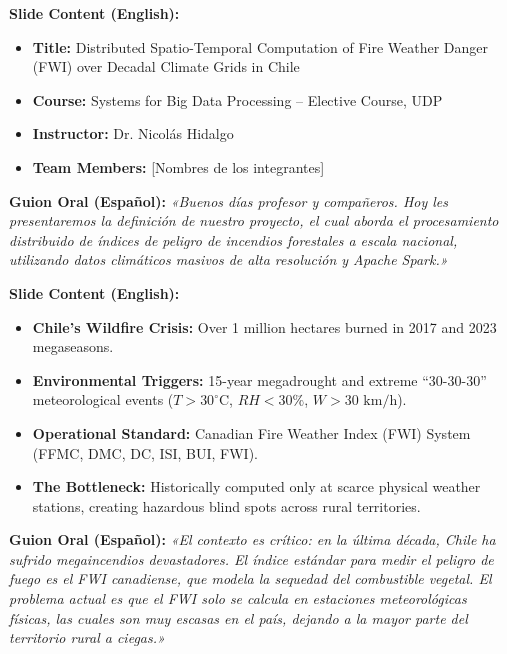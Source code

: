 \documentclass[11pt,a4paper]{article}
\begin{document}
\begin{tcolorbox}[colback=white, colframe=primaryblue, title=\textbf{Slide 1: Title \& Authors (0:00 -- 0:30)}]
\textbf{Slide Content (English):}
\begin{itemize}[leftmargin=4mm, itemsep=1pt]
    \item \textbf{Title:} Distributed Spatio-Temporal Computation of Fire Weather Danger (FWI) over Decadal Climate Grids in Chile
    \item \textbf{Course:} Systems for Big Data Processing -- Elective Course, UDP
    \item \textbf{Instructor:} Dr. Nicolás Hidalgo
    \item \textbf{Team Members:} [Nombres de los integrantes]
\end{itemize}
\textbf{Guion Oral (Español):}
\textit{«Buenos días profesor y compañeros. Hoy les presentaremos la definición de nuestro proyecto, el cual aborda el procesamiento distribuido de índices de peligro de incendios forestales a escala nacional, utilizando datos climáticos masivos de alta resolución y Apache Spark.»}
\end{tcolorbox}

\begin{tcolorbox}[colback=white, colframe=primaryblue, title=\textbf{Slide 2: Context \& Background (0:30 -- 1:30)}]
\textbf{Slide Content (English):}
\begin{itemize}[leftmargin=4mm, itemsep=1pt]
    \item \textbf{Chile's Wildfire Crisis:} Over 1 million hectares burned in 2017 and 2023 megaseasons.
    \item \textbf{Environmental Triggers:} 15-year megadrought and extreme ``30-30-30'' meteorological events ($T > 30^\circ\text{C}$, $RH < 30\%$, $W > 30\text{ km/h}$).
    \item \textbf{Operational Standard:} Canadian Fire Weather Index (FWI) System (FFMC, DMC, DC, ISI, BUI, FWI).
    \item \textbf{The Bottleneck:} Historically computed only at scarce physical weather stations, creating hazardous blind spots across rural territories.
\end{itemize}
\textbf{Guion Oral (Español):}
\textit{«El contexto es crítico: en la última década, Chile ha sufrido megaincendios devastadores. El índice estándar para medir el peligro de fuego es el FWI canadiense, que modela la sequedad del combustible vegetal. El problema actual es que el FWI solo se calcula en estaciones meteorológicas físicas, las cuales son muy escasas en el país, dejando a la mayor parte del territorio rural a ciegas.»}
\end{tcolorbox}
\end{document}

